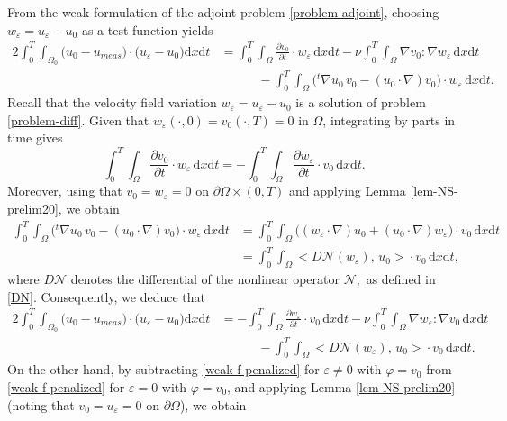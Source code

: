 \documentclass[a4paper,12pt,reqno,natbib]{amsart}
\newcommand{\dx} {\displaystyle\mathrm{d}x}
\newcommand{\dt} {\displaystyle\mathrm{d}t}
\def\N{\mathcal N}
\begin{document}
\vspace{0.4cm}
From the weak formulation of the adjoint problem \eqref{problem-adjoint}, choosing \( w_\varepsilon = u_\varepsilon - u_0 \) as a test function yields
%
\begin{align*}
    2\int_0^T\int_{\Omega_0}\big(u_0-u_{meas}\big)\cdot\big(u_\varepsilon-u_0\big)\dx\dt&=\int_0^T\int_{\Omega}\frac {\partial v_0}{\partial t} \cdot w_\varepsilon\,\dx\dt-\nu\int_0^T\int_\Omega\nabla v_0:\nabla w_\varepsilon\,\dx\dt\\
    &\qquad\quad-\int_0^T\int_\Omega\big({}^t\nabla u_0\,v_0- (u_0\cdot\nabla)v_0\big)\cdot w_\varepsilon\,\dx\dt.
\end{align*}
Recall that the velocity field variation \( w_\varepsilon = u_\varepsilon - u_0 \) is a solution of problem \eqref{problem-diff}.  Given that \( w_\varepsilon(\cdot,0) =v_0(\cdot,T) = 0 \) in \( \Omega \), integrating by parts in time gives
\begin{equation*}
    \int_0^T\int_{\Omega}\frac {\partial v_0}{\partial t} \cdot w_\varepsilon\,\dx\dt=-\int_0^T\int_{\Omega}\frac {\partial w_\varepsilon}{\partial t} \cdot v_0\,\dx\dt.
\end{equation*}
Moreover, using that \( v_0 = w_\varepsilon = 0 \) on \( \partial\Omega \times (0,T) \) and applying Lemma \ref{lem-NS-prelim20}, we obtain
\begin{align*}
       \int_0^T\int_\Omega\big( {}^t\nabla u_0\,v_0-(u_0\cdot\nabla)v_0\big)\cdot w_\varepsilon\,\dx\dt&=\int_0^T\int_\Omega\big((w_\varepsilon\cdot\nabla)u_0+ (u_0\cdot\nabla)w_\varepsilon\big)\cdot v_0\,\dx\dt\\
       &=\int_0^T\int_\Omega\big<D\N(w_\varepsilon),\,u_0\big>\cdot v_0\,\dx\dt,
\end{align*}
where $D\N$ denotes the differential of the nonlinear operator $\N,$ as defined in \eqref{DN}. Consequently, we deduce that
\begin{align}\label{cl-1}
  \nonumber  2\int_0^T\int_{\Omega_0}\big(u_0-u_{meas}\big)\cdot\big(u_\varepsilon-u_0\big)\dx\dt&=-\int_0^T\int_{\Omega}\frac {\partial w_\varepsilon}{\partial t} \cdot v_0\,\dx\dt-\nu\int_0^T\int_\Omega\nabla w_\varepsilon:\nabla v_0\,\dx\dt\\
    &\qquad\quad-\int_0^T\int_\Omega\big<D\N(w_\varepsilon),\,u_0\big>\cdot v_0\,\dx\dt.
\end{align}
On the other hand, by subtracting \eqref{weak-f-penalized} for \( \varepsilon \neq 0 \) with \( \varphi = v_0 \) from \eqref{weak-f-penalized} for \( \varepsilon = 0 \) with \( \varphi = v_0 \), and applying Lemma \ref{lem-NS-prelim20} (noting that \( v_0 = u_\varepsilon = 0 \) on \( \partial\Omega \)), we obtain
\end{document}
